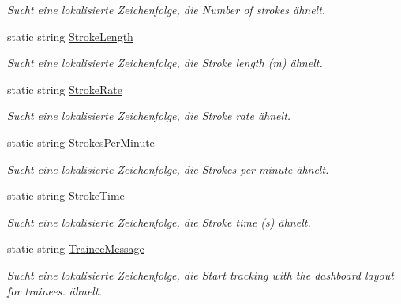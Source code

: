\begin{DoxyCompactItemize}
\begin{DoxyCompactList}\small\item\em Sucht eine lokalisierte Zeichenfolge, die Number of strokes ähnelt. \end{DoxyCompactList}\item 
static string \hyperlink{class_rowing_monitor_1_1_properties_1_1_resources_a4d981dd414bccd9c3ce89a0e4b039fb2}{Stroke\+Length}
\begin{DoxyCompactList}\small\item\em Sucht eine lokalisierte Zeichenfolge, die Stroke length (m) ähnelt. \end{DoxyCompactList}\item 
static string \hyperlink{class_rowing_monitor_1_1_properties_1_1_resources_aabc0c41d4809bfc5722d408ce806b33f}{Stroke\+Rate}
\begin{DoxyCompactList}\small\item\em Sucht eine lokalisierte Zeichenfolge, die Stroke rate ähnelt. \end{DoxyCompactList}\item 
static string \hyperlink{class_rowing_monitor_1_1_properties_1_1_resources_afb08e8d0b2a23eb35c2474f4da6403f0}{Strokes\+Per\+Minute}
\begin{DoxyCompactList}\small\item\em Sucht eine lokalisierte Zeichenfolge, die Strokes per minute ähnelt. \end{DoxyCompactList}\item 
static string \hyperlink{class_rowing_monitor_1_1_properties_1_1_resources_aab7fa214e8f9007449965d132bbe7d4d}{Stroke\+Time}
\begin{DoxyCompactList}\small\item\em Sucht eine lokalisierte Zeichenfolge, die Stroke time (s) ähnelt. \end{DoxyCompactList}\item 
static string \hyperlink{class_rowing_monitor_1_1_properties_1_1_resources_ad8c651181f3f820b2604964cf28ec195}{Trainee\+Message}
\begin{DoxyCompactList}\small\item\em Sucht eine lokalisierte Zeichenfolge, die Start tracking with the dashboard layout for trainees. ähnelt. \end{DoxyCompactList}\item 

\end{DoxyCompactItemize}

